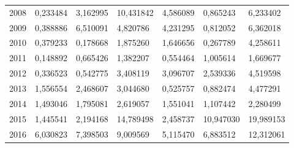 \begin{table}
\begin{tabular}{p{1cm}p{2cm}p{2cm}p{2cm}p{2cm}p{2cm}p{2cm}}
 2008 &                               0,233484 &                                     3,162995 &                                   10,431842 &             4,586089 &                                0,865243 &                        6,233402 \\
 2009 &                               0,388886 &                                     6,510091 &                                    4,820786 &             4,231295 &                                0,812052 &                        6,362018 \\
 2010 &                               0,379233 &                                     0,178668 &                                    1,875260 &             1,646656 &                                0,267789 &                        4,258611 \\
 2011 &                               0,148892 &                                     0,665426 &                                    1,382207 &             0,554464 &                                1,005614 &                        1,669677 \\
 2012 &                               0,336523 &                                     0,542775 &                                    3,408119 &             3,096707 &                                2,539336 &                        4,519598 \\
 2013 &                               1,556554 &                                     2,468607 &                                    3,044680 &             0,525757 &                                0,882474 &                        4,477291 \\
 2014 &                               1,493046 &                                     1,795081 &                                    2,619057 &             1,551041 &                                1,107442 &                        2,280499 \\
 2015 &                               1,445541 &                                     2,194168 &                                   14,789498 &             2,458737 &                               10,947030 &                       19,989153 \\
 2016 &                               6,030823 &                                     7,398503 &                                    9,009569 &             5,115470 &                                6,883512 &                       12,312061 \\
\bottomrule
\end{tabular}
\end{table}

